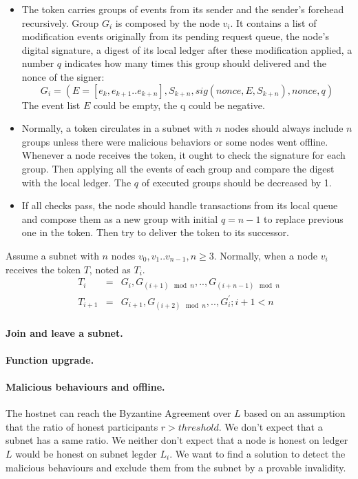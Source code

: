 \documentclass[11pt]{article}
\begin{document}
\begin{itemize}
\item The token carries groups of events from its sender and the sender{'}s forehead recursively.
Group $G_{i}$ is composed by the node $v_{i}$. It contains a list of modification events originally from its pending request queue, the node{'}s digital signature, a digest of its local ledger after these modification applied, a number $q$ indicates how many times this group should delivered and the nonce of the signer:
\begin{equation}
G_{i} = (E = [e_{k}, e_{k+1}..e_{k+n}], S_{k+n}, sig(nonce, E, S_{k+n}), nonce, q)
\end{equation}
The event list $E$ could be empty, the q could be negative.

\item Normally, a token circulates in a subnet with $n$ nodes should always include $n$ groups unless there were malicious behaviors or some nodes went offline.
Whenever a node receives the token, it ought to check the signature for each group.
Then applying all the events of each group and compare the digest with the local ledger.
The $q$ of executed groups should be decreased by 1.

\item If all checks pass, the node should handle transactions from its local queue and compose them as a new group with initial $q=n-1$ to replace previous one in the token.
Then try to deliver the token to its successor.
\end{itemize}

Assume a subnet with $n$ nodes \( v_{0}, v_{1} .. v_{n-1}, n\geq 3\). Normally, when a node $v_{i}$ receives the token $T$, noted as $T_{i}$.
\begin{eqnarray}
T_{i} &=& G_{i}, G_{(i + 1)\mod n},.., G_{(i + n - 1)\mod n}\\
T_{i+1} &=& G_{i+1}, G_{(i+2)\mod n},..,G_{i}^{\prime}; i+1<n
\end{eqnarray}

\paragraph{Join and leave a subnet.}

\paragraph{Function upgrade.}

\paragraph{Malicious behaviours and offline.}
The hostnet can reach the Byzantine Agreement over $L$ based on an assumption that the ratio of honest participants $r > threshold$.
We don{'}t expect that a subnet has a same ratio. We neither don{'}t expect that a node is honest on ledger $L$ would be honest on subnet legder $L_{i}$.
We want to find a solution to detect the malicious behaviours and exclude them from the subnet by a provable invalidity.
\end{document}
